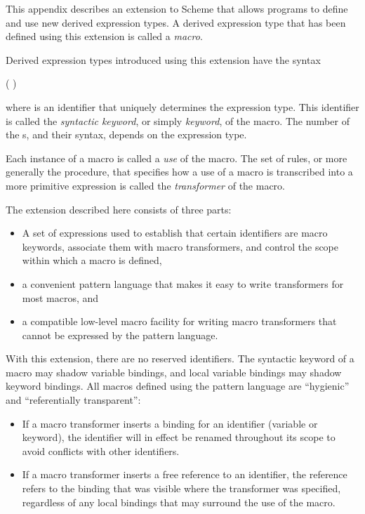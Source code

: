 
This appendix describes an extension to Scheme that allows programs
to define and use new derived expression types.
A derived expression type that has been defined using this extension
is called a {\em macro}.

Derived expression types introduced using this extension have
the syntax
\begin{scheme}
( )%
\end{scheme}%
where  is an identifier that uniquely determines the
expression type.  This identifier is called the {\em syntactic
keyword}, or simply {\em
keyword}, of the macro.  The
number of the s, and their syntax, depends on the
expression type.

Each instance of a macro is called a {\em use}
of the macro.
The set of rules, or more generally the procedure, that specifies
how a use of a macro is transcribed into a more primitive expression
is called the {\em transformer}
of the macro.

The extension described here consists of three parts:

\begin{itemize}

\item A set of expressions used to establish that certain identifiers
are macro keywords, associate them with macro transformers, and control
the scope within which a macro is defined,

\item a convenient pattern language that makes it easy to write
transformers for most macros, and

\item a compatible low-level macro facility for writing macro
transformers that cannot be expressed by the pattern language.

\end{itemize}

With this extension, there are no reserved identifiers.  The syntactic
keyword of a macro may shadow variable bindings, and local variable
bindings may shadow keyword bindings.   All macros
defined using the pattern language are ``hygienic'' and
``referentially transparent'':

\begin{itemize}

\item If a macro transformer inserts a binding for an identifier
(variable or keyword), the identifier will in effect be renamed
throughout its scope to avoid conflicts with other identifiers.

\item If a macro transformer inserts a free reference to an
identifier, the reference refers to the binding that was visible
where the transformer was specified, regardless of any local
bindings that may surround the use of the macro.

\end{itemize}

